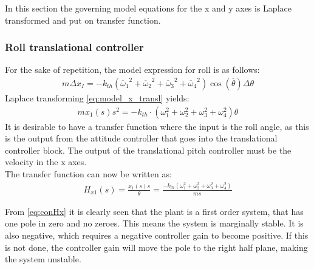 In this section the governing model equations for the x and y axes is Laplace transformed and put on transfer function. 
\subsubsection*{Roll translational controller}
For the sake of repetition, the model expression for roll is as follows:
\begin{align}
m\Delta\ddot{x}_I = -k_{th}({\overline{\omega}_1}^2+{\overline{\omega}_2}^2+{\overline{\omega}_3}^2+{\overline{\omega}_4}^2)\cos(\overline{\theta})\Delta\theta
\label{eq:model_x_transl}
\end{align} 
Laplace transforming \autoref{eq:model_x_transl} yields:
\begin{align}
m x_1(s)s^2=-k_{th}\cdot (\omega_1 ^2 + \omega_2 ^2 + \omega_3 ^2 + \omega_4 ^2) \theta
\end{align}
It is desirable to have a transfer function where the input is the roll angle, as this is the output from the attitude controller that goes into the translational controller block. The output of the translational pitch controller must be the velocity in the x axes. \\
The transfer function can now be written as:
\begin{align}
H_{x1}(s)=\frac{x_1(s) s}{\theta}=\frac{-k_{th} (\omega_1 ^2 + \omega_2 ^2 + \omega_3 ^2 + \omega_4 ^2)}{m s}\label{eq:conHx}
\end{align}
\begin{where}
\end{where}

From \autoref{eq:conHx} it is clearly seen that the plant is a first order system, that has one pole in zero and no zeroes. This means the system is marginally stable. It is also negative, which requires a negative controller gain to become positive. If this is not done, the controller gain will move the pole to the right half plane, making the system unstable. 

